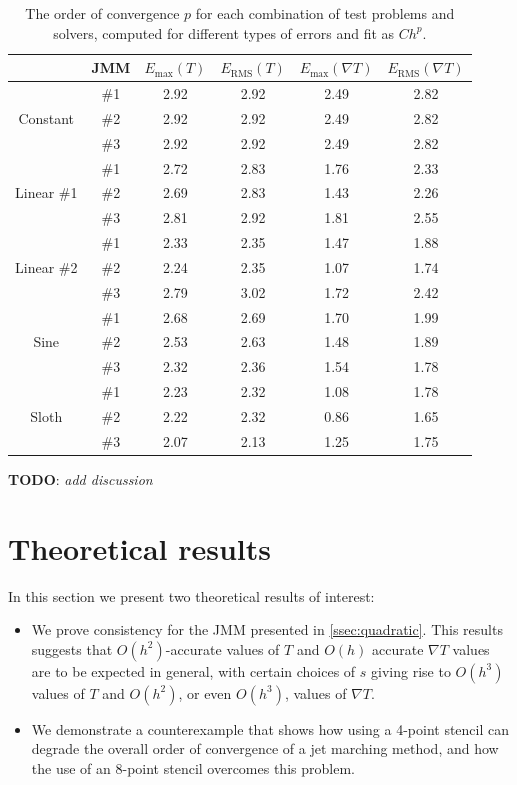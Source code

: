 \documentclass{siamart190516}
\begin{document}
\begin{table}
  \centering
  \begin{tabular}{cccccc}
    & JMM & $E_{\mbox{max}} (T)$ & $E_{\mbox{RMS}} (T)$& $E_{\mbox{max}} (\nabla T)$ & $E_{\mbox{RMS}} (\nabla T)$ \\
    \midrule
    \multirow{3}{*}{Constant}
    & \#1 & 2.92 & 2.92 & 2.49 & 2.82 \\
    & \#2 & 2.92 & 2.92 & 2.49 & 2.82 \\
    & \#3 & 2.92 & 2.92 & 2.49 & 2.82 \\
    \midrule
    \multirow{3}{*}{Linear \#1}
    & \#1 & 2.72 & 2.83 & 1.76 & 2.33 \\
    & \#2 & 2.69 & 2.83 & 1.43 & 2.26 \\
    & \#3 & 2.81 & 2.92 & 1.81 & 2.55 \\
    \midrule
    \multirow{3}{*}{Linear \#2}
    & \#1 & 2.33 & 2.35 & 1.47 & 1.88 \\
    & \#2 & 2.24 & 2.35 & 1.07 & 1.74 \\
    & \#3 & 2.79 & 3.02 & 1.72 & 2.42 \\
    \midrule
    \multirow{3}{*}{Sine}
    & \#1 & 2.68 & 2.69 & 1.70 & 1.99 \\
    & \#2 & 2.53 & 2.63 & 1.48 & 1.89 \\
    & \#3 & 2.32 & 2.36 & 1.54 & 1.78 \\
    \midrule
    \multirow{3}{*}{Sloth}
    & \#1 & 2.23 & 2.32 & 1.08 & 1.78 \\
    & \#2 & 2.22 & 2.32 & 0.86 & 1.65 \\
    & \#3 & 2.07 & 2.13 & 1.25 & 1.75 \\
  \end{tabular}
  \caption{The order of convergence $p$ for each combination of test
    problems and solvers, computed for different types of errors and
    fit as $C h^p$.}\label{fig:least-squares-fits}
\end{table}

\textbf{TODO}: \emph{add discussion}

\section{Theoretical results} In this section we present two
theoretical results of interest:
\begin{itemize}
\item We prove consistency for the JMM presented in
  \ref{ssec:quadratic}. This results suggests that $O(h^2)$-accurate
  values of $T$ and $O(h)$ accurate $\nabla T$ values are to be
  expected in general, with certain choices of $s$ giving rise to
  $O(h^3)$ values of $T$ and $O(h^2)$, or even $O(h^3)$, values of
  $\nabla T$.
\item We demonstrate a counterexample that shows how using a 4-point
  stencil can degrade the overall order of convergence of a jet
  marching method, and how the use of an 8-point stencil overcomes
  this problem.
\end{itemize}
\end{document}
